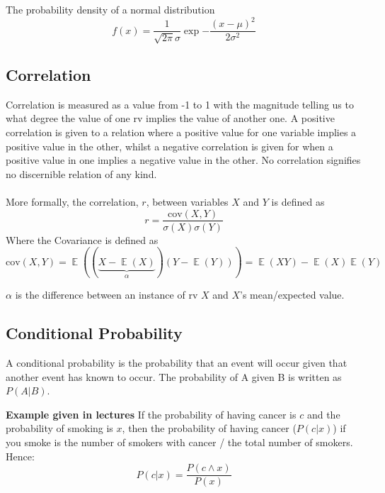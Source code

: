 \documentclass{article}
\DeclareMathOperator{\E}{\mathbb{E}}
\begin{document}
        The probability density of a normal distribution
        \begin{equation}
        f(x) = \frac{1}{\sqrt{2\pi}\sigma}\exp{-\frac{{(x-\mu)}^2}{2\sigma^2}}
        \end{equation}
    
    \subsection{Correlation}
        Correlation is measured as a value from -1 to 1 with the magnitude telling us to what degree the value of one rv implies the value of another one. A positive correlation is given to a relation where a positive value for one variable implies a positive value in the other, whilst a negative correlation is given for when a positive value in one implies a negative value in the other. No correlation signifies no discernible relation of any kind.\\
        \\
        More formally, the correlation, $r$, between variables $X$ and $Y$ is defined as
        \begin{equation}
            r = \frac{\textrm{cov}(X,Y)}{\sigma(X)\sigma(Y)}
        \end{equation}
        Where the Covariance is defined as
        \begin{equation}
            \textrm{cov}(X,Y) = \E((\underbrace{X-\E(X)}_\alpha)(Y-\E(Y))) = \E(XY)-\E(X)\E(Y)
        \end{equation}
        
        $\alpha$ is the difference between an instance of rv $X$ and $X$'s mean/expected value.
        
    \subsection{Conditional Probability}
        A conditional probability is the probability that an event will occur given that another event has known to occur. The probability of A given B is written as $P(A|B)$.
        
        \textbf{Example given in lectures}
        If the probability of having cancer is $c$ and the probability of smoking is $x$, then the probability of having cancer ($P(c|x)$) if you smoke is the number of smokers with cancer / the total number of smokers. Hence:
        \begin{equation}\label{equ:condprob}
            P(c|x) = \frac{P(c\wedge  x)}{P(x)}
        \end{equation}
\end{document}
